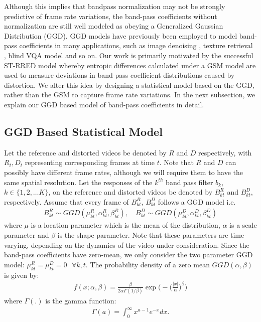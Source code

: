 \documentclass[journal]{IEEEtran}
\newcommand{\ie}{{i}.{e}.}
\begin{document}
Although this implies that bandpass normalization may not be strongly predictive of frame rate variations, the band-pass coefficients without normalization are still well modeled as obeying a Generalized Gaussian Distribution (GGD). GGD models have previously been employed to model band-pass coefficients in many applications, such as image denoising \cite{chang2000adaptive}, texture retrieval \cite{do2002wavelet}, blind VQA model \cite{saad2014blind} and so on. Our work is primarily motivated by the successful ST-RRED model \cite{soundararajan2012rred} whereby entropic differences calculated under a GSM model are used to measure deviations in band-pass coefficient distributions caused by distortion. We alter this idea by designing a statistical model based on the GGD, rather than the GSM to capture frame rate variations. In the next subsection, we explain our GGD based model of band-pass coefficients in detail.

\subsection{GGD Based Statistical Model}
\label{subsec:GGD_model}
Let the reference and distorted videos be denoted by $R$ and $D$ respectively, with $R_t,D_t$ representing corresponding frames at time $t$. Note that $R$ and $D$ can possibly have different frame rates, although we will require them to have the same spatial resolution. Let the responses of the $k^{th}$ band pass filter $b_k$, $k\in \{1,2,\ldots K\}$, on the reference and distorted videos be denoted by $B_{kt}^R$ and $B_{kt} ^D$, respectively. Assume that every frame of $B_{kt}^R$, $B_{kt}^D$ follows a GGD model \ie{ } 
\begin{align}
    B_{kt}^R \sim GGD(\mu_{kt} ^{R},\alpha_{kt} ^{R},\beta_{kt} ^{R}), \quad B_{kt}^D \sim GGD(\mu_{kt} ^{D},\alpha_{kt} ^{D},\beta_{kt} ^{D})
    \label{eqn:ggd_assumption}
\end{align}
where $\mu$ is a location parameter which is the mean of the distribution, $\alpha$ is a scale parameter and $\beta$ is the shape parameter. Note that these parameters are time-varying, depending on the dynamics of the video under consideration. Since the band-pass coefficients have zero-mean, we only consider the two parameter GGD model: $\mu_{kt}^{R} = \mu_{kt}^{D} = 0 \text{ }\forall k,t$. The probability density of a zero mean $GGD(\alpha,\beta)$ is given by:
\begin{align*}
    f(x;\alpha,\beta) = \frac{\beta}{2\alpha\Gamma(1/\beta)}\exp\Big(-\Big(\frac{|x|}{\alpha}\Big)^{\beta}\Big)
\end{align*}
where $\Gamma(.)$ is the gamma function:
\begin{align*}
    \Gamma(a) = \int_0 ^{\infty}x^{a-1}e^{-x} dx .
\end{align*}
\end{document}
